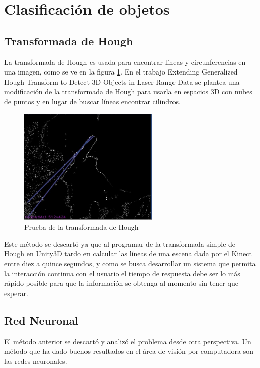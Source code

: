  \section{Clasificación de objetos}  
    \subsection{Transformada de Hough}
        La transformada de Hough es usada para encontrar líneas y circunferencias en una imagen, como se ve en la figura \ref{fig:unityhough}. En el trabajo Extending Generalized Hough Transform to Detect 3D Objects in
        Laser Range Data se plantea una modificación de la transformada de Hough para usarla en espacios 3D con nubes de puntos y en lugar de buscar líneas encontrar cilindros.\\
        
        
        \begin{figure}[!htb]
            \centering
            \includegraphics[width=0.6\textwidth]{02Desarrollo/RANSAC/imagenes/hough.JPG}
            \caption{Prueba de la transformada de Hough} 
            \label{fig:unityhough}
        \end{figure}
    
        Este método se descartó ya que al programar de la transformada simple de Hough en Unity3D tardo en calcular las líneas de una escena dada por el Kinect entre diez a quince segundos, y como se busca desarrollar un sistema que permita la interacción continua con el usuario el tiempo de respuesta debe ser lo más rápido posible para que la información se obtenga al momento sin tener que esperar.\\
        
    \subsection{Red Neuronal}
        El método anterior se descartó y analizó el problema desde otra perspectiva. Un método que ha dado buenos resultados en el área de visión por computadora son las redes neuronales.\\
        
